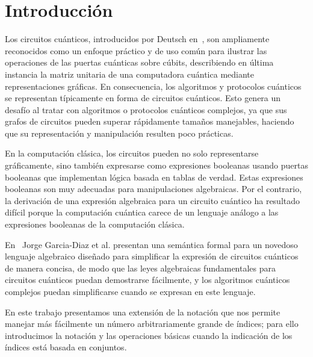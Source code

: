\section{Introducción}

Los circuitos cuánticos, introducidos por Deutsch en~\cite{Deutsch1989}, son ampliamente reconocidos como un enfoque práctico y de uso común para ilustrar las operaciones de las puertas cuánticas sobre cúbits, describiendo en última instancia la matriz unitaria de una computadora cuántica mediante representaciones gráficas.
En consecuencia, los algoritmos y protocolos cuánticos se representan típicamente en forma de circuitos cuánticos.
Esto genera un desafío al tratar con algoritmos o protocolos cuánticos complejos, ya que sus grafos de circuitos pueden superar rápidamente tamaños manejables, haciendo que su representación y manipulación resulten poco prácticas.

En la computación clásica, los circuitos pueden no solo representarse gráficamente, sino también expresarse como expresiones booleanas usando puertas booleanas que implementan lógica basada en tablas de verdad.
Estas expresiones booleanas son muy adecuadas para manipulaciones algebraicas.
Por el contrario, la derivación de una expresión algebraica para un circuito cuántico ha resultado difícil porque la computación cuántica carece de un lenguaje análogo a las expresiones booleanas de la computación clásica.

En~\cite{reina2024ix} Jorge Garcia-Diaz et al. presentan una semántica formal para un novedoso lenguaje algebraico diseñado para
simplificar la expresión de circuitos cuánticos de manera concisa, de modo que las leyes algebraicas fundamentales para circuitos cuánticos puedan demostrarse fácilmente, y los algoritmos cuánticos complejos puedan simplificarse cuando se expresan en este lenguaje.

En este trabajo presentamos una extensión de la notación que nos permite manejar más fácilmente un número arbitrariamente grande de índices; para ello introducimos la notación y las operaciones básicas cuando la indicación de los índices está basada en conjuntos.
